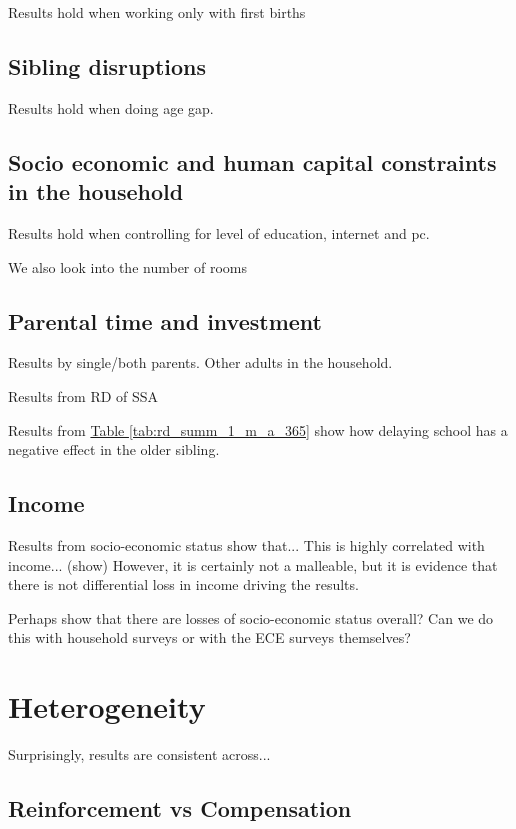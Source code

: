 Results hold when working only with first births

\subsection{Sibling disruptions}

Results hold when doing age gap.

\subsection{Socio economic and human capital constraints in the household}

Results hold when controlling for level of education, internet and pc.

We also look into the number of rooms\

\subsection{Parental time and investment}

Results by single/both parents. Other adults in the household.

Results from RD of SSA

Results from \hyperref[tab:rd_summ_1_m_a_365]{Table \ref{tab:rd_summ_1_m_a_365}} show how delaying school has a negative effect in the older sibling. 

\subsection{Income}

Results from socio-economic status show that... 
This is highly correlated with income... (show)
However, it is certainly not a malleable, but it is evidence that there is not differential loss in income driving the results.

Perhaps show that there are losses of socio-economic status overall? Can we do this with household surveys or with the ECE surveys themselves?

\section{Heterogeneity}\label{sec:heterogeneity}

Surprisingly, results are consistent across...

\subsection{Reinforcement vs Compensation}

